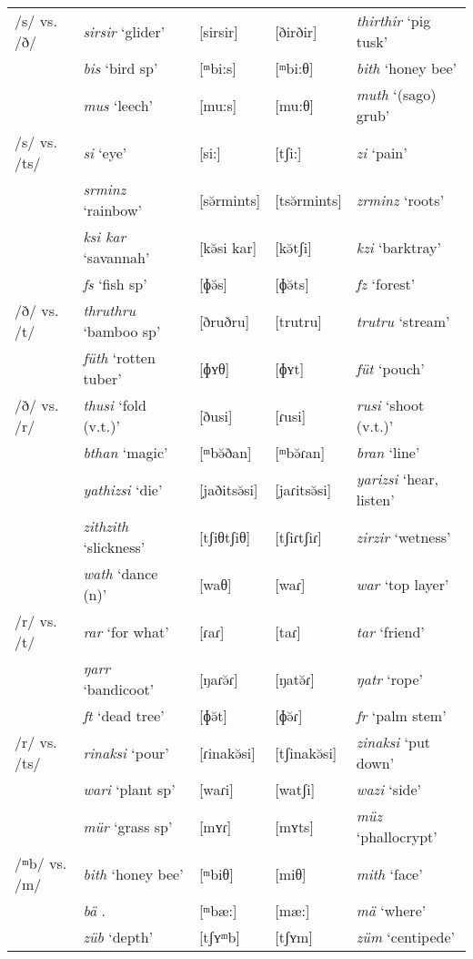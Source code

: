 \begin{longtable}{lllll}
		/s/ vs. /ð/			&\emph{sirsir} `glider'&[sirsir]&[ðirðir]&\emph{thirthir} `pig tusk'\\
							&\emph{bis} `bird sp'&[ᵐbi:s]&[ᵐbi:θ]&\emph{bith} `honey bee'\\
							&\emph{mus} `leech'&[mu:s]&[mu:θ]&\emph{muth} `(sago) grub'\\
		/s/ vs. /ts/		&\emph{si} `eye'&[si:]&[tʃi:]&\emph{zi} `pain'\\
							&\emph{srminz} `rainbow'&[sə̆rmints]&[tsə̆rmints]&\emph{zrminz} `roots'\\
							&\emph{ksi kar} `savannah'&[kə̆si kar]&[kə̆tʃi]&\emph{kzi} `barktray'\\
							&\emph{fs} `fish sp'&[ɸə̆s]&[ɸə̆ts]&\emph{fz} `forest'\\
		/ð/ vs. /t/			&\emph{thruthru} `bamboo sp'&[ðruðru]&[trutru]&\emph{trutru} `stream'\\
							&\emph{füth} `rotten tuber'&[ɸʏθ]&[ɸʏt]&\emph{füt} `pouch'\\
		/ð/ vs. /r/			&\emph{thusi} `fold (v.t.)'&[ðusi]&[ɾusi]&\emph{rusi} `shoot (v.t.)'\\
							&\emph{bthan} `magic'&[ᵐbə̆ðan]&[ᵐbə̆ɾan]&\emph{bran} `line'\\
							&\emph{yathizsi} `die'&[jaðitsə̆si]&[jaɾitsə̆si]&\emph{yarizsi} `hear, listen'\\
							&\emph{zithzith} `slickness'&[tʃiθtʃiθ]&[tʃiɾtʃiɾ]&\emph{zirzir} `wetness'\\
							&\emph{wath} `dance (n)'&[waθ]&[waɾ]&\emph{war} `top layer'\\
		/r/ vs. /t/			&\emph{rar} `for what'&[ɾaɾ]&[taɾ]&\emph{tar} `friend'\\
							&\emph{ŋarr} `bandicoot'&[ŋaɾə̆ɾ]&[ŋatə̆ɾ]&\emph{ŋatr} `rope'\\
							&\emph{ft} `dead tree'&[ɸə̆t]&[ɸə̆ɾ]&\emph{fr} `palm stem'\\
		/r/ vs. /ts/		&\emph{rinaksi} `pour'&[ɾinakə̆si]&[tʃinakə̆si]&\emph{zinaksi} `put down'\\
							&\emph{wari} `plant sp'&[waɾi]&[watʃi]&\emph{wazi} `side'\\
							&\emph{mür} `grass sp'&[mʏɾ]&[mʏts]&\emph{müz} `phallocrypt'\\
		/{ᵐ}b/ vs. /m/		&\emph{bith} `honey bee'&[ᵐbiθ]&[miθ]&\emph{mith} `face'\\
							&\emph{bä} \Second.{\Abs}&[ᵐbæ:]&[mæ:]&\emph{mä} `where' \\
							&\emph{züb} `depth'&[tʃʏᵐb]&[tʃʏm]&\emph{züm} `centipede'\\

\end{longtable}
